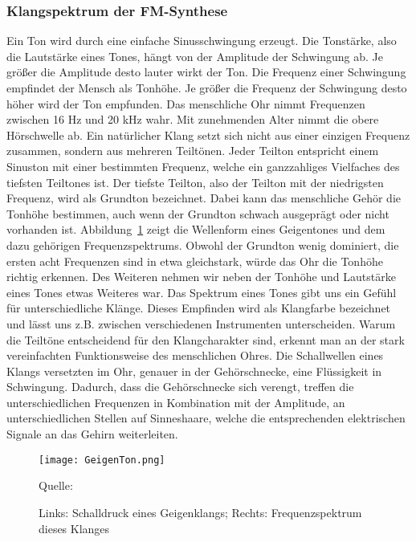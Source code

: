 \subsubsection{Klangspektrum der FM-Synthese}
\label{bulli:ohrToeneUndFrequenzen}
Ein Ton wird durch eine einfache Sinusschwingung erzeugt. Die Tonstärke, also die Lautstärke eines Tones, hängt von der Amplitude der Schwingung ab. Je größer die Amplitude desto lauter wirkt der Ton. Die Frequenz einer Schwingung empfindet der Mensch als Tonhöhe. Je größer die Frequenz der Schwingung desto höher wird der Ton empfunden. 
Das menschliche Ohr nimmt Frequenzen zwischen 16 Hz und 20 kHz wahr. Mit zunehmenden Alter nimmt die obere Hörschwelle ab. \cite[S. 199]{borucki}
Ein natürlicher Klang setzt sich nicht aus einer einzigen Frequenz zusammen, sondern aus mehreren Teiltönen. Jeder Teilton entspricht einem Sinuston mit einer bestimmten Frequenz, welche ein ganzzahliges Vielfaches des tiefsten Teiltones ist. Der tiefste Teilton, also der Teilton mit der niedrigsten Frequenz, wird als Grundton bezeichnet. \cite[S. 87]{borucki} 
Dabei kann das menschliche Gehör die Tonhöhe bestimmen, auch wenn der Grundton schwach ausgeprägt oder nicht vorhanden ist. \cite[S. 4]{zwicker} Abbildung~\ref{fig:geige} zeigt die Wellenform eines Geigentones und dem dazu gehörigen Frequenzspektrums. Obwohl der Grundton wenig dominiert, die ersten acht Frequenzen sind in etwa gleichstark, würde das Ohr die Tonhöhe richtig erkennen. Des Weiteren nehmen wir neben der Tonhöhe und Lautstärke eines Tones etwas Weiteres war. Das Spektrum eines Tones gibt uns ein Gefühl für unterschiedliche Klänge. Dieses Empfinden wird als Klangfarbe bezeichnet und lässt uns z.B. zwischen verschiedenen Instrumenten unterscheiden. \cite[S. 5]{zwicker} \cite[S. 226]{raichel}
Warum die Teiltöne entscheidend für den Klangcharakter sind, erkennt man an der stark vereinfachten Funktionsweise des menschlichen Ohres. Die Schallwellen eines Klangs versetzten im Ohr, genauer in der Gehörschnecke, eine Flüssigkeit in Schwingung. Dadurch, dass die Gehörschnecke sich verengt, treffen die unterschiedlichen Frequenzen in Kombination mit der Amplitude, an unterschiedlichen Stellen auf Sinneshaare, welche die entsprechenden elektrischen Signale an das Gehirn weiterleiten. \cite[S. 87 f.]{zwicker}

\begin{figure} [ht]
\centering
  \texttt{[image: GeigenTon.png]}
\caption{Links: Schalldruck eines Geigenklangs; Rechts: Frequenzspektrum dieses Klanges}
\label{fig:geige}
Quelle: \cite[S. 4]{zwicker}
\end{figure}
\FloatBarrier

